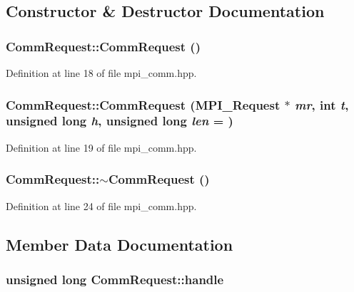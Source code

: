 \subsection{Constructor \& Destructor Documentation}
\hypertarget{struct_comm_request_a43ae409cb5a60a94d3bcf4c9cc251e6d}{
\subsubsection[{CommRequest}]{\setlength{\rightskip}{0pt plus 5cm}CommRequest::CommRequest ()}}
\label{struct_comm_request_a43ae409cb5a60a94d3bcf4c9cc251e6d}


Definition at line 18 of file mpi\_\-comm.hpp.\hypertarget{struct_comm_request_a6f7d4a9e54cd82b411839f4703372fd5}{
\subsubsection[{CommRequest}]{\setlength{\rightskip}{0pt plus 5cm}CommRequest::CommRequest (MPI\_\-Request $\ast$ {\em mr}, \/  int {\em t}, \/  unsigned long {\em h}, \/  unsigned long {\em len} = {})}}
\label{struct_comm_request_a6f7d4a9e54cd82b411839f4703372fd5}


Definition at line 19 of file mpi\_\-comm.hpp.\hypertarget{struct_comm_request_a78280275ce91ac1ba72600ad40f54190}{
\subsubsection[{$\sim$CommRequest}]{\setlength{\rightskip}{0pt plus 5cm}CommRequest::$\sim$CommRequest ()}}
\label{struct_comm_request_a78280275ce91ac1ba72600ad40f54190}


Definition at line 24 of file mpi\_\-comm.hpp.

\subsection{Member Data Documentation}
\hypertarget{struct_comm_request_a8fc33aa63e2da5b320bdfb3488fd627b}{
\subsubsection[{handle}]{\setlength{\rightskip}{0pt plus 5cm}unsigned long {\bf CommRequest::handle}}}
\label{struct_comm_request_a8fc33aa63e2da5b320bdfb3488fd627b}


